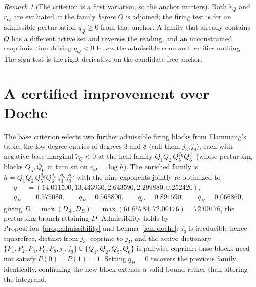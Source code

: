 \documentclass[11pt,reqno]{amsart}
\theoremstyle{plain}
\theoremstyle{definition}
\theoremstyle{remark}
\newtheorem{remark}[theorem]{Remark}
\newcommand{\rQ}{r_Q}
\newcommand{\dA}{D_A}
\newcommand{\dB}{D_B}
\begin{document}
\begin{remark}[The criterion is a first variation, so the anchor matters]\label{rem:anchor}
Both $\widetilde r_Q$ and $\rQ$ are evaluated at the family \emph{before} $Q$ is
adjoined; the firing test is for an admissible perturbation $q_Q\ge0$ from that anchor.
A family that already contains $Q$ has a different active set and reverses the reading,
and an unconstrained reoptimization driving $q_Q<0$ leaves the admissible cone and
certifies nothing. The sign test is the right derivative on the candidate-free anchor.
\end{remark}

\section{A certified improvement over Doche}\label{sec:bound}

The base criterion selects two further admissible firing blocks from Flammang's
\citep{F18} table, the low-degree entries of degrees $3$ and $8$ (call them $j_3,j_9$),
each with negative base marginal $\widetilde r_Q<0$ at the held family
$Q_1Q_2\,Q_5^{q_E}Q_6^{q_F}$ (whose perturbing blocks $Q_5,Q_6$ in turn sit on
$\rQ=\log h$). The enriched family is
$h=Q_1Q_2\,Q_5^{q_E}Q_6^{q_F}\,j_3^{q_G}j_9^{q_H}$ with the nine exponents jointly
re-optimized to
\begin{align*}
  q&=(14.011500,13.443930,2.643590,2.299880,0.252420),\\
  q_E&=0.575080,\qquad q_F=0.568800,\qquad
  q_G=0.891590,\qquad q_H=0.066860,
\end{align*}
giving $D=\max(\dA,\dB)=\max(61.65784,72.00176)=72.00176$, the perturbing branch
attaining $D$. Admissibility holds by Proposition~\ref{prop:admissibility} and
Lemma~\ref{lem:doche}: $j_9$ is irreducible
hence squarefree, distinct from $j_3$, coprime to $j_3$, and the active dictionary
$\{P_1,P_2,P_4,P_6,P_8,j_3,j_9\}\cup\{Q_1,Q_2,Q_5,Q_6\}$ is pairwise coprime; base
blocks need not satisfy $P(0)=P(1)=1$. Setting $q_H=0$ recovers the previous family
identically, confirming the new block extends a valid bound rather than altering the
integrand.
\end{document}
